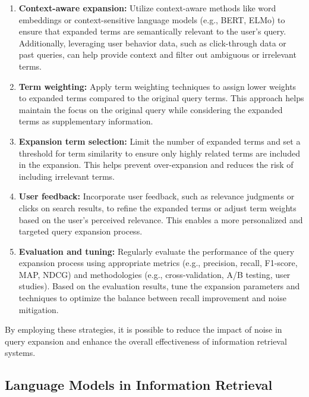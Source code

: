\documentclass[12pt]{article}
\begin{document}
\begin{enumerate}
\item \textbf{Context-aware expansion:} Utilize context-aware methods like word embeddings or context-sensitive language models (e.g., BERT, ELMo) to ensure that expanded terms are semantically relevant to the user's query. Additionally, leveraging user behavior data, such as click-through data or past queries, can help provide context and filter out ambiguous or irrelevant terms.

\item \textbf{Term weighting:} Apply term weighting techniques to assign lower weights to expanded terms compared to the original query terms. This approach helps maintain the focus on the original query while considering the expanded terms as supplementary information.

\item \textbf{Expansion term selection:} Limit the number of expanded terms and set a threshold for term similarity to ensure only highly related terms are included in the expansion. This helps prevent over-expansion and reduces the risk of including irrelevant terms.

\item \textbf{User feedback:} Incorporate user feedback, such as relevance judgments or clicks on search results, to refine the expanded terms or adjust term weights based on the user's perceived relevance. This enables a more personalized and targeted query expansion process.

\item \textbf{Evaluation and tuning:} Regularly evaluate the performance of the query expansion process using appropriate metrics (e.g., precision, recall, F1-score, MAP, NDCG) and methodologies (e.g., cross-validation, A/B testing, user studies). Based on the evaluation results, tune the expansion parameters and techniques to optimize the balance between recall improvement and noise mitigation.
\end{enumerate}

By employing these strategies, it is possible to reduce the impact of noise in query expansion and enhance the overall effectiveness of information retrieval systems.



\subsection{Language Models in Information Retrieval}
\end{document}
